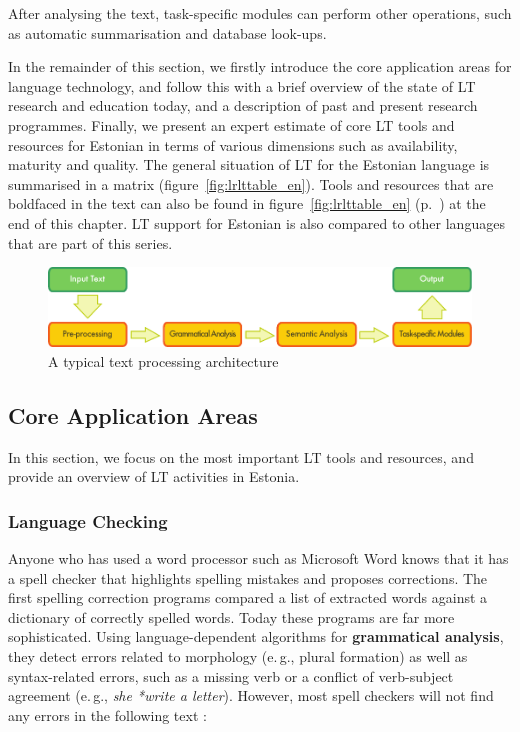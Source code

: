 \begin{multicols}{2}
After analysing the text, task-specific modules can perform other operations, such as automatic summarisation and database look-ups.

In the remainder of this section, we firstly introduce the core application areas for language technology, and follow this with a brief overview of the state of LT research and education today, and a description of past and present research programmes. Finally, we present an expert estimate of core LT tools and resources for Estonian in terms of various dimensions such as availability, maturity and quality. The general situation of LT for the Estonian language is summarised in a matrix (figure~\ref{fig:lrlttable_en}). Tools and resources that are boldfaced in the text can also be found in figure~\ref{fig:lrlttable_en} (p.~\pageref{fig:lrlttable_en}) at the end of this chapter. LT support for Estonian is also compared to other languages that are part of this series.

\begin{figure}[htb]
  \center
  \includegraphics[width=\textwidth]{../_media/english/text_processing_app_architecture}
  \caption{A typical text processing architecture}
\label{fig:textprocessingarch_en}
\end{figure}

\subsection{Core Application Areas}

In this section, we focus on the most important LT tools and resources, and provide an overview of LT activities in Estonia. 

\subsubsection{Language Checking}

Anyone who has used a word processor such as Microsoft Word knows that it has a spell checker that highlights spelling mistakes and proposes corrections. The first spelling correction programs compared a list of extracted words against a dictionary of correctly spelled words. Today these programs are far more sophisticated. Using language-dependent algorithms for \textbf{grammatical analysis}, they detect errors related to morphology (e.\,g., plural formation) as well as syntax-related errors, such as a missing verb or a conflict of verb-subject agreement (e.\,g., \textit{she *write a letter}). However, most spell checkers will not find any errors in the following text \cite{zar1}:


\end{multicols}
